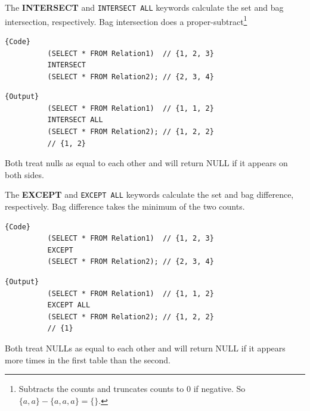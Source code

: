     \begin{definition}[Intersection]
      The \textbf{INTERSECT} and \texttt{INTERSECT ALL} keywords calculate the set and bag intersection, respectively. Bag intersection does a proper-subtract\footnote{Subtracts the counts and truncates counts to $0$ if negative. So $\{a, a\} - \{a, a, a\} = \{\}$.} 

      \noindent\begin{minipage}{.5\textwidth}
        \begin{lstlisting}[]{Code}
          (SELECT * FROM Relation1)  // {1, 2, 3}
          INTERSECT 
          (SELECT * FROM Relation2); // {2, 3, 4}
        \end{lstlisting}
        \end{minipage}
        \hfill
        \begin{minipage}{.49\textwidth}
        \begin{lstlisting}[]{Output}
          (SELECT * FROM Relation1)  // {1, 1, 2}
          INTERSECT ALL 
          (SELECT * FROM Relation2); // {1, 2, 2}
          // {1, 2}
        \end{lstlisting}
      \end{minipage}
      Both treat nulls as equal to each other and will return NULL if it appears on both sides. 
    \end{definition}

    \begin{definition}[Difference]
      The \textbf{EXCEPT} and \texttt{EXCEPT ALL} keywords calculate the set and bag difference, respectively. Bag difference takes the minimum of the two counts. 

      \noindent\begin{minipage}{.5\textwidth}
        \begin{lstlisting}[]{Code}
          (SELECT * FROM Relation1)  // {1, 2, 3}
          EXCEPT 
          (SELECT * FROM Relation2); // {2, 3, 4}
        \end{lstlisting}
        \end{minipage}
        \hfill
        \begin{minipage}{.49\textwidth}
        \begin{lstlisting}[]{Output}
          (SELECT * FROM Relation1)  // {1, 1, 2}
          EXCEPT ALL 
          (SELECT * FROM Relation2); // {1, 2, 2}
          // {1}
        \end{lstlisting}
      \end{minipage}
      Both treat NULLs as equal to each other and will return NULL if it appears more times in the first table than the second. 
    \end{definition}

